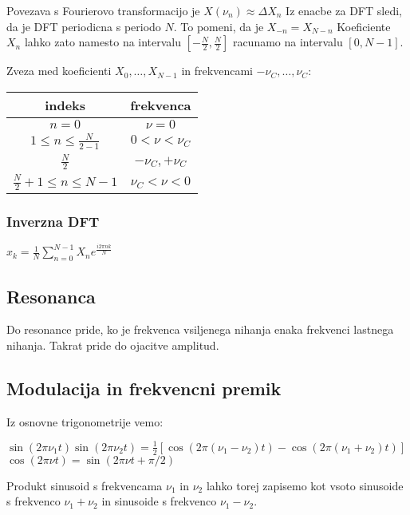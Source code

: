 \documentclass{article}
\begin{document}
\begin{multicols}{4}
Povezava s Fourierovo transformacijo je $X(\nu_n) \approx \Delta X_n$
Iz enacbe za DFT sledi, da je DFT periodicna s periodo $N$. To pomeni, da je $X_{-n} = X_{N-n}$
Koeficiente $X_n$ lahko zato namesto na intervalu $[-\frac{N}{2}, \frac{N}{2}]$ racunamo na
intervalu $[0, N - 1]$.

Zveza med koeficienti $X_0, \dots, X_{N-1}$ in frekvencami $- \nu_C, \dots, \nu_C$:
\begin{center}
    \begin{tabular}{ cc } 
        indeks & frekvenca \\
        \hline
            $n = 0$                             &  $\nu = 0$ \\
            $1 \leq n \leq \frac{N}{2-1}$       &  $0 < \nu < \nu_C$ \\
            $\frac{N}{2}$                       &  $-\nu_C, + \nu_C$ \\
            $\frac{N}{2} + 1 \leq n \leq N - 1$ &  $\nu_C < \nu < 0$ \\
        \hline
    \end{tabular}
\end{center}

\subsubsection{Inverzna DFT}
\begin{center}
    \begin{math}
        x_k = \frac{1}{N} \sum_{n=0}^{N-1} X_{n}e^{\frac{i2 \pi n k}{N}}
    \end{math}
\end{center}

\subsection{Resonanca}
Do resonance pride, ko je frekvenca vsiljenega nihanja enaka frekvenci lastnega nihanja. Takrat pride do ojacitve amplitud.

\subsection{Modulacija in frekvencni premik}

Iz osnovne trigonometrije vemo:
\begin{center}
    \begin{math}
        \sin(2 \pi \nu_1 t) \sin(2 \pi \nu_2 t) = \frac{1}{2} [\cos(2 \pi(\nu_1 - \nu_2)t) - \cos(2 \pi (\nu_1 + \nu_2)t)]
    \end{math}\\
    \begin{math}
        \cos(2 \pi \nu t) = \sin(2 \pi \nu t + \pi / 2)
    \end{math}
\end{center}
Produkt sinusoid s frekvencama $\nu_1$ in $\nu_2$ lahko torej zapisemo kot vsoto sinusoide s frekvenco $\nu_1 + \nu_2$ in 
sinusoide s frekvenco $\nu_1 - \nu_2$.


\end{multicols}
\end{document}
